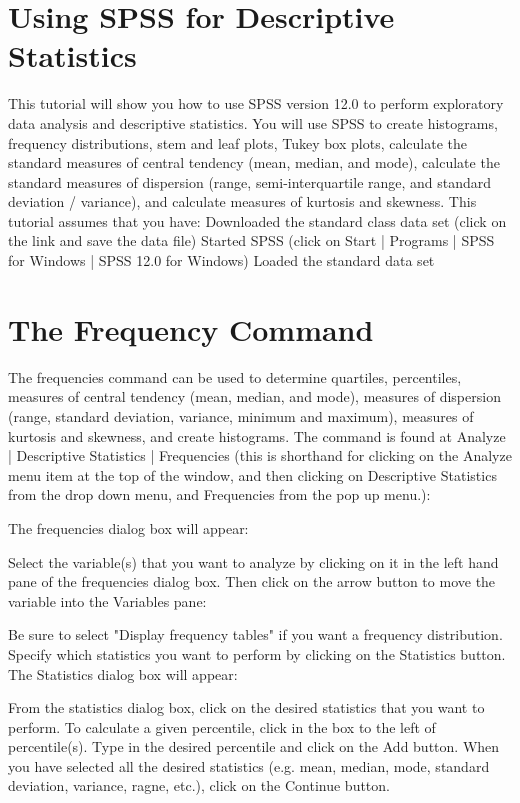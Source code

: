 \section{Using SPSS for Descriptive Statistics}



This tutorial will show you how to use SPSS version 12.0 to perform exploratory data analysis and descriptive statistics. You will use SPSS to create histograms, frequency distributions, stem and leaf plots, Tukey box plots, calculate the standard measures of central tendency (mean, median, and mode), calculate the standard measures of dispersion (range, semi-interquartile range, and standard deviation / variance), and calculate measures of kurtosis and skewness. This tutorial assumes that you have:
Downloaded the standard class data set (click on the link and save the data file)
Started SPSS (click on Start | Programs | SPSS for Windows | SPSS 12.0 for Windows)
Loaded the standard data set

\section{The Frequency Command}

The frequencies command can be used to determine quartiles, percentiles, measures of central tendency (mean, median, and mode), measures of dispersion (range, standard deviation, variance, minimum and maximum), measures of kurtosis and skewness, and create histograms. The command is found at Analyze | Descriptive Statistics | Frequencies (this is shorthand for clicking on the Analyze menu item at the top of the window, and then clicking on Descriptive Statistics from the drop down menu, and Frequencies from the pop up menu.):

The frequencies dialog box will appear:

Select the variable(s) that you want to analyze by clicking on it in the left hand pane of the frequencies dialog box. Then click on the arrow button to move the variable into the Variables pane:

Be sure to select "Display frequency tables" if you want a frequency distribution. Specify which statistics you want to perform by clicking on the Statistics button. The Statistics dialog box will appear:

From the statistics dialog box, click on the desired statistics that you want to perform. To calculate a given percentile, click in the box to the left of percentile(s). Type in the desired percentile and click on the Add button. When you have selected all the desired statistics (e.g. mean, median, mode, standard deviation, variance, ragne, etc.), click on the Continue button.

